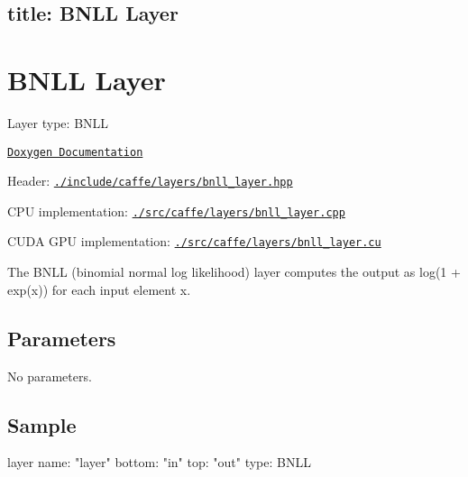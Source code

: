 

 \subsection*{title\+: B\+N\+LL Layer }

\section*{B\+N\+LL Layer}


\begin{DoxyItemize}
\item Layer type\+: {\ttfamily B\+N\+LL}
\item \href{http://caffe.berkeleyvision.org/doxygen/classcaffe_1_1BNLLLayer.html}{\tt Doxygen Documentation}
\item Header\+: \href{https://github.com/BVLC/caffe/blob/master/include/caffe/layers/bnll_layer.hpp}{\tt {\ttfamily ./include/caffe/layers/bnll\+\_\+layer.hpp}}
\item C\+PU implementation\+: \href{https://github.com/BVLC/caffe/blob/master/src/caffe/layers/bnll_layer.cpp}{\tt {\ttfamily ./src/caffe/layers/bnll\+\_\+layer.cpp}}
\item C\+U\+DA G\+PU implementation\+: \href{https://github.com/BVLC/caffe/blob/master/src/caffe/layers/bnll_layer.cu}{\tt {\ttfamily ./src/caffe/layers/bnll\+\_\+layer.cu}}
\end{DoxyItemize}

The {\ttfamily B\+N\+LL} (binomial normal log likelihood) layer computes the output as log(1 + exp(x)) for each input element x.

\subsection*{Parameters}

No parameters.

\subsection*{Sample}

\begin{DoxyVerb}  layer {
    name: "layer"
    bottom: "in"
    top: "out"
    type: BNLL
  }\end{DoxyVerb}
 